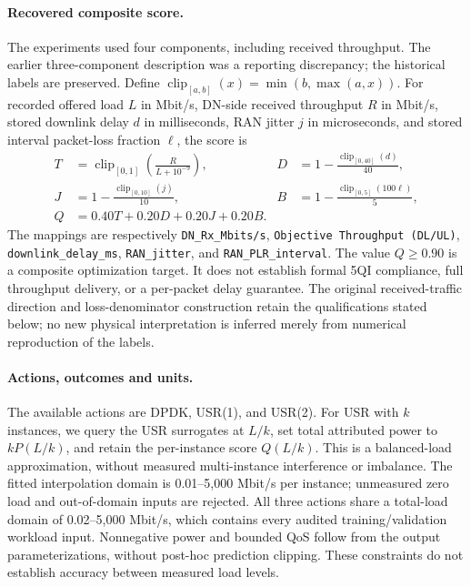\paragraph{Recovered composite score.}
The experiments used four components, including received throughput. The earlier
three-component description was a reporting discrepancy; the historical labels
are preserved. Define $\operatorname{clip}_{[a,b]}(x)=\min(b,\max(a,x))$.
For recorded offered load $L$ in Mbit/s, DN-side received throughput $R$ in
Mbit/s, stored downlink delay $d$ in milliseconds, RAN jitter $j$ in microseconds,
and stored interval packet-loss fraction $\ell$, the score is
\begin{align}
 T &= \operatorname{clip}_{[0,1]}\!\left(\frac{R}{L+10^{-9}}\right), &
 D &= 1-\frac{\operatorname{clip}_{[0,40]}(d)}{40},\\
 J &= 1-\frac{\operatorname{clip}_{[0,10]}(j)}{10}, &
 B &= 1-\frac{\operatorname{clip}_{[0,5]}(100\ell)}{5},\\
 Q &= 0.40T+0.20D+0.20J+0.20B.
\end{align}
The mappings are respectively \texttt{DN\_Rx\_Mbits/s},
\texttt{Objective Throughput (DL/UL)}, \texttt{downlink\_delay\_ms},
\texttt{RAN\_jitter}, and \texttt{RAN\_PLR\_interval}.
The value $Q\geq0.90$ is a composite optimization target. It does not establish
formal 5QI compliance, full throughput delivery, or a per-packet delay guarantee.
The original received-traffic direction and loss-denominator construction retain
the qualifications stated below; no new physical interpretation is inferred
merely from numerical reproduction of the labels.

\paragraph{Actions, outcomes and units.}
The available actions are DPDK, USR(1), and USR(2). For USR with $k$ instances,
we query the USR surrogates at $L/k$, set total attributed power to $kP(L/k)$,
and retain the per-instance score $Q(L/k)$. This is a balanced-load approximation,
without measured multi-instance interference or imbalance. The fitted
interpolation domain is 0.01--5,000 Mbit/s per instance; unmeasured zero load
and out-of-domain inputs are rejected. All three actions share a total-load
domain of 0.02--5,000 Mbit/s, which contains every audited training/validation
workload input. Nonnegative power and bounded QoS follow from the output
parameterizations, without post-hoc prediction clipping. These constraints do
not establish accuracy between measured load levels.

